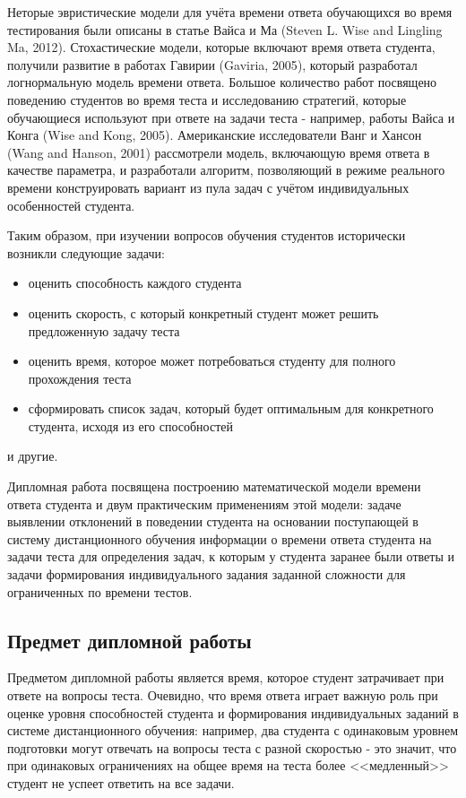 Неторые эвристические модели для учёта времени ответа обучающихся во время тестирования были описаны в статье Вайса и Ма (Steven L. Wise and Lingling Ma, 2012\cite{18.}). Стохастические модели, которые включают время ответа студента, получили развитие в работах Гавирии (Gaviria, 2005\cite{17.}), который разработал логнормальную модель времени ответа. Большое коли\-чество работ посвящено поведению студентов во время теста и исследованию стратегий, которые обу\-чающиеся используют при ответе на задачи теста - например, работы Вайса и Конга (Wise and Kong, 2005\cite{19.}). Американские исследователи Ванг и Хансон (Wang and Hanson, 2001\cite{20.}) рассмотрели мо\-дель, включающую время ответа в качестве параметра, и разработали алго\-ритм, позволяющий в режиме реального времени конструировать вариант из пула задач с учётом индиви\-дуальных особенностей студента.

Таким образом, при изучении вопросов обучения студентов исторически возникли следующие задачи:
\begin{itemize}
\item оценить способность каждого студента
\item оценить скорость, с который конкретный студент может решить пред\-ложенную задачу теста
\item оценить время, которое может потребоваться студенту для полного про\-хождения теста
\item сформировать список задач, который будет оптимальным для конкрет\-ного студента, исходя из его способностей
\end{itemize}
и другие.

Дипломная работа посвящена построению математической модели вре\-мени ответа студента и двум практическим применениям этой модели: задаче выяв\-лении отклонений в поведении студента на основании поступающей в систему дистан\-ционного обучения информации о времени ответа студента на задачи теста для определения задач, к которым у студента заранее были ответы и задачи формирования индивидуального задания заданной слож\-ности для ограниченных по времени тестов. 

\subsection{Предмет дипломной работы}

Предметом дипломной работы является время, которое студент затрачи\-вает при ответе на вопросы теста. Очевидно, что время ответа играет важную роль при оценке уровня способностей студента и формирования индивидуаль\-ных заданий в системе дистанционного обучения: например, два студента с одина\-ковым уровнем подготовки  могут отвечать на вопросы теста с разной скоростью - это значит, что при одинаковых ограничениях на общее время на теста более <<медленный>> студент не успеет ответить на все задачи.

